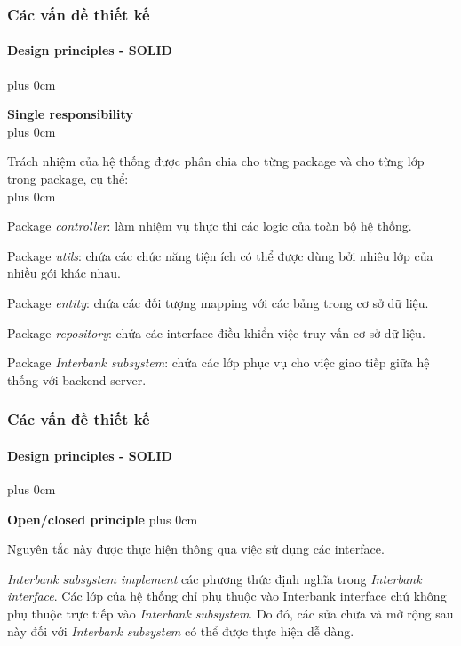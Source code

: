 \documentclass[11pt]{beamer}
\renewcommand{\raggedright}{\leftskip=0pt \rightskip=0pt plus 0cm}
\let\olditemize=\itemize
\renewenvironment{itemize}{\olditemize\raggedright}{\endlist}
\begin{document}
\begin{frame}[plain]
	\frametitle{Các vấn đề thiết kế}
	\framesubtitle{Design principles - SOLID}
	\begin{itemize}
		\item \textbf{Single responsibility}\\[10pt]
		\begin{itemize}
			\item Trách nhiệm của hệ thống được phân chia cho từng package và cho từng lớp trong package, cụ thể:\\[8pt]
			\begin{itemize}
				\item Package \textit{controller}: làm nhiệm vụ thực thi các logic của toàn bộ hệ thống.
				\item Package \textit{utils}: chứa các chức năng tiện ích có thể được dùng bởi nhiêu lớp của nhiều gói khác nhau.
				\item Package \textit{entity}: chứa các đối tượng mapping với các bảng trong cơ sở dữ liệu.
				\item Package \textit{repository}: chứa các interface điều khiển việc truy vấn cơ sở dữ liệu. 
				\item Package \textit{Interbank subsystem}: chứa các lớp phục vụ cho việc giao tiếp giữa hệ thống với backend server.
			\end{itemize}
		\end{itemize}
	\end{itemize}
\end{frame}
\begin{frame}[plain]
	\frametitle{Các vấn đề thiết kế}
	\framesubtitle{Design principles - SOLID}
	\begin{itemize}
		\item \textbf{Open/closed principle}
		\begin{itemize}
			\item Nguyên tắc này được thực hiện thông qua việc sử dụng các interface.
			\item \textit{Interbank subsystem implement} các phương thức định nghĩa trong \textit{Interbank interface}. Các lớp của hệ thống chỉ phụ thuộc vào Interbank interface chứ không phụ thuộc trực tiếp vào \textit{Interbank subsystem}. Do đó, các sửa chữa và mở rộng sau này đối với \textit{Interbank subsystem} có thể được thực hiện dễ dàng.
		\end{itemize}
	\end{itemize}
\end{frame}
\end{document}
